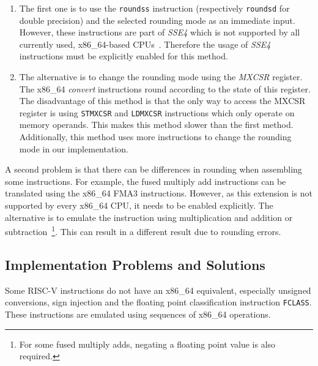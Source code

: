 \documentclass[course=eragp]{aspdoc}
\begin{document}
\begin{enumerate}
    \item The first one is to use the \texttt{roundss} instruction (respectively \texttt{roundsd}
          for double precision) and the selected rounding mode as an immediate input. However, these
          instructions are part of \textit{SSE4} which is not supported by all currently used, x86\_64-based
          CPUs~\cite{intel2017man}. Therefore the usage of \textit{SSE4} instructions must be explicitly enabled for
          this method.

    \item The alternative is to change the rounding mode using the \emph{MXCSR} register. The
          x86\_64 \emph{convert} instructions round according to the state of this register. 
          The disadvantage of this method is that the only way to access the MXCSR register 
          is using \texttt{STMXCSR} and \texttt{LDMXCSR} instructions which only operate on
          memory operands. This makes this method slower than the first method. Additionally,
          this method uses more instructions to change the rounding mode in our implementation.~\cite{intel2017man}
\end{enumerate}

\par


A second problem is that there can be differences in rounding when assembling some instructions. For
example, the fused multiply add instructions can be translated using the x86\_64 FMA3 instructions.
However, as this extension is not supported by every x86\_64 CPU, it needs to be enabled explicitly. The alternative
is to emulate the instruction using multiplication and addition or subtraction~\footnote{For some
fused multiply adds, negating a floating point value is also required.}. This can result in a
different result due to rounding errors.


\subsection{Implementation Problems and Solutions}

Some RISC-V instructions do not have an x86\_64 equivalent, especially unsigned conversions, sign
injection and the floating point classification instruction \texttt{FCLASS}. These instructions
are emulated using sequences of x86\_64 operations.


\par
\end{document}

